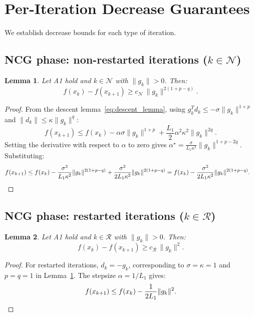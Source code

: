 \documentclass{article}
\newtheorem{lemma}{Lemma}
\begin{document}

\section{Per-Iteration Decrease Guarantees}
\label{sec:decrease}

We establish decrease bounds for each type of iteration.

\subsection{NCG phase: non-restarted iterations ($k \in \mathcal{N}$)}

\begin{lemma}
\label{lem:decrease_N}
Let A1 hold and $k \in \mathcal{N}$ with $\|g_k\| > 0$. Then:
\begin{equation}
\label{eq:decrease_N}
f(x_k) - f(x_{k+1}) \geq c_{\mathcal{N}}\, \|g_k\|^{2(1+p-q)}.
\end{equation}
\end{lemma}
\begin{proof}
From the descent lemma~\eqref{eq:descent_lemma}, using $g_k^T d_k \leq -\sigma\|g_k\|^{1+p}$ and $\|d_k\| \leq \kappa\|g_k\|^q$:
\[
f(x_{k+1}) \leq f(x_k) - \alpha\sigma\|g_k\|^{1+p} + \frac{L_1}{2}\alpha^2\kappa^2\|g_k\|^{2q}.
\]
Setting the derivative with respect to $\alpha$ to zero gives $\alpha^\star = \frac{\sigma}{L_1\kappa^2}\|g_k\|^{1+p-2q}$. Substituting:
\begin{align*}
f(x_{k+1}) &\leq f(x_k) - \frac{\sigma^2}{L_1\kappa^2}\|g_k\|^{2(1+p-q)} + \frac{\sigma^2}{2L_1\kappa^2}\|g_k\|^{2(1+p-q)} = f(x_k) - \frac{\sigma^2}{2L_1\kappa^2}\|g_k\|^{2(1+p-q)}. \qedhere
\end{align*}
\end{proof}

\subsection{NCG phase: restarted iterations ($k \in \mathcal{R}$)}

\begin{lemma}
\label{lem:decrease_R}
Let A1 hold and $k \in \mathcal{R}$ with $\|g_k\| > 0$. Then:
\begin{equation}
\label{eq:decrease_R}
f(x_k) - f(x_{k+1}) \geq c_{\mathcal{R}}\, \|g_k\|^{2}.
\end{equation}
\end{lemma}
\begin{proof}
For restarted iterations, $d_k = -g_k$, corresponding to $\sigma = \kappa = 1$ and $p = q = 1$ in Lemma~\ref{lem:decrease_N}. The stepsize $\alpha = 1/L_1$ gives:
\[
f(x_{k+1}) \leq f(x_k) - \frac{1}{2L_1}\|g_k\|^2. \qedhere
\]
\end{proof}
\end{document}

